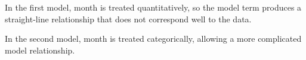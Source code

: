 \begin{description}

In the first model, month is treated quantitatively, so the model term
 produces a straight-line relationship that does not
correspond well to the data.

In the second model, month is treated categorically, allowing a more
complicated model relationship.


\end{description}
